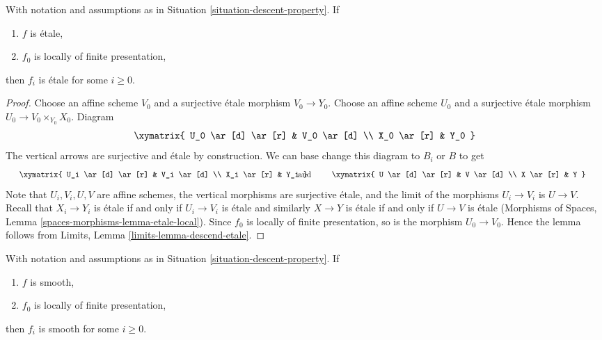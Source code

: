 \begin{lemma}
\label{lemma-descend-etale}
With notation and assumptions as in
Situation \ref{situation-descent-property}. If
\begin{enumerate}
\item $f$ is \'etale,
\item $f_0$ is locally of finite presentation,
\end{enumerate}
then $f_i$ is \'etale for some $i \geq 0$.
\end{lemma}

\begin{proof}
Choose an affine scheme $V_0$ and a surjective \'etale morphism
$V_0 \to Y_0$. Choose an affine scheme $U_0$ and a surjective \'etale
morphism $U_0 \to V_0 \times_{Y_0} X_0$. Diagram
$$
\xymatrix{
U_0 \ar[d] \ar[r] & V_0 \ar[d] \\
X_0 \ar[r] & Y_0
}
$$
The vertical arrows are surjective and \'etale by construction.
We can base change this diagram to $B_i$ or $B$ to get
$$
\vcenter{
\xymatrix{
U_i \ar[d] \ar[r] & V_i \ar[d] \\
X_i \ar[r] & Y_i
}
}
\quad\text{and}\quad
\vcenter{
\xymatrix{
U \ar[d] \ar[r] & V \ar[d] \\
X \ar[r] & Y
}
}
$$
Note that $U_i, V_i, U, V$ are affine schemes,
the vertical morphisms are surjective \'etale, and the limit of the
morphisms $U_i \to V_i$ is $U \to V$. Recall that $X_i \to Y_i$ is \'etale
if and only if $U_i \to V_i$ is
\'etale and similarly $X \to Y$ is \'etale if and only if
$U \to V$ is \'etale
(Morphisms of Spaces, Lemma \ref{spaces-morphisms-lemma-etale-local}).
Since $f_0$ is locally of finite
presentation, so is the morphism $U_0 \to V_0$. Hence the lemma follows
from Limits, Lemma \ref{limits-lemma-descend-etale}.
\end{proof}

\begin{lemma}
\label{lemma-descend-smooth}
With notation and assumptions as in
Situation \ref{situation-descent-property}. If
\begin{enumerate}
\item $f$ is smooth,
\item $f_0$ is locally of finite presentation,
\end{enumerate}
then $f_i$ is smooth for some $i \geq 0$.
\end{lemma}

